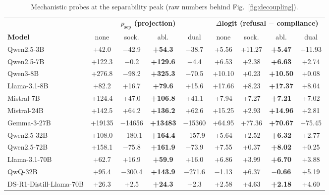 \documentclass{article}
\begin{document}
\begin{table}[h]
\centering
\scriptsize
\begin{tabular}{lcc>{\columncolor{ctrlshade}}cccc>{\columncolor{ctrlshade}}cc}
\toprule
& \multicolumn{4}{c}{\textbf{$p_{\text{sep}}$ (projection)}} & \multicolumn{4}{c}{\textbf{$\Delta$logit (refusal $-$ compliance)}} \\
\cmidrule(lr){2-5} \cmidrule(lr){6-9}
\textbf{Model} & none & sock. & abl. & dual & none & sock. & abl. & dual \\
\midrule
Qwen2.5-3B   & +42.0 & $-$42.9 & \textbf{+54.3} & $-$38.7 & +5.56 & +11.27 & \textbf{+5.47} & +11.93 \\
Qwen2.5-7B   & +122.3 & $-$0.2 & \textbf{+129.6} & +4.4 & +6.53 & +2.38 & \textbf{+6.63} & +2.74 \\
Qwen3-8B     & +276.8 & $-$98.2 & \textbf{+325.3} & $-$70.5 & +10.10 & +0.23 & \textbf{+10.50} & +0.08 \\
Llama-3.1-8B & +82.2 & +16.7 & \textbf{+79.6} & +15.6 & +17.66 & +8.23 & \textbf{+17.37} & +8.04 \\
Mistral-7B   & +124.4 & +47.0 & \textbf{+106.8} & +41.1 & +7.94 & +7.27 & \textbf{+7.21} & +7.02 \\
Mistral-24B  & +142.5 & +64.2 & \textbf{+136.2} & +62.6 & +15.25 & +2.93 & \textbf{+14.96} & +2.81 \\
Gemma-3-27B  & +19135 & $-$14656 & \textbf{+13483} & $-$15360 & +64.95 & +77.36 & \textbf{+70.67} & +75.45 \\
Qwen2.5-32B  & +108.0 & $-$180.1 & \textbf{+164.4} & $-$157.9 & +5.64 & +2.52 & \textbf{+6.32} & +2.77 \\
Qwen2.5-72B  & +158.1 & $-$75.8 & \textbf{+161.9} & $-$73.9 & +7.55 & +0.37 & \textbf{+8.02} & +0.25 \\
Llama-3.1-70B & +62.7 & +16.9 & \textbf{+59.9} & +16.0 & +6.86 & +3.99 & \textbf{+6.70} & +3.88 \\
\rowcolor{reasoning} QwQ-32B      & +95.4 & $-$300.4 & \textbf{+143.9} & $-$271.6 & $-$1.13 & +6.37 & \textbf{$-$0.66} & +5.19 \\
\rowcolor{reasoning} DS-R1-Distill-Llama-70B & +26.3 & +2.5 & \textbf{+24.3} & +2.3 & +2.58 & +4.63 & \textbf{+2.18} & +4.60 \\
\bottomrule
\end{tabular}
\caption{Mechanistic probes at the separability peak (raw numbers behind Fig.~\ref{fig:decoupling}).}
\label{tab:mech}
\end{table}

\clearpage
\end{document}
